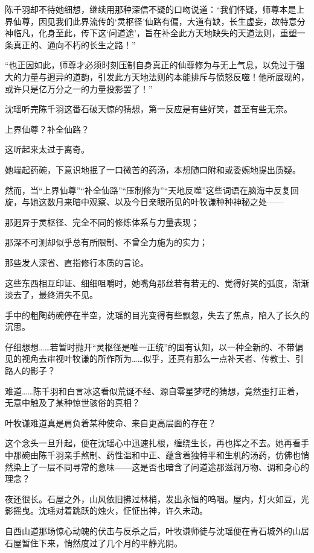 陈千羽却不待她细想，继续用那种深信不疑的口吻说道：“我们怀疑，师尊本是上界仙尊，因见我们此界流传的‘灵枢径’仙路有偏，大道有缺，长生虚妄，故特意分神临凡，化身至此，传下这‘问道途’，旨在补全此方天地缺失的天道法则，重塑一条真正的、通向不朽的长生之路！”

“也正因如此，师尊才必须时刻压制自身真正的仙尊修为与无上气息，以免过于强大的力量与迥异的道韵，引发此方天地法则的本能排斥与愤怒反噬！他所展现的，或许只是亿万分之一的力量投影罢了！”

沈瑶听完陈千羽这番石破天惊的猜想，第一反应是有些好笑，甚至有些无奈。

上界仙尊？补全仙路？

这听起来太过于离奇。

她端起药碗，下意识地抿了一口微苦的药汤，本想随口附和或委婉地提出质疑。

然而，当“上界仙尊”“补全仙路”“压制修为”“天地反噬”这些词语在脑海中反复回旋，与她这数月来暗中观察、以及今日亲眼所见的叶牧谦种种神秘之处——

那迥异于灵枢径、完全不同的修炼体系与力量表现；

那深不可测却似乎总有所限制、不曾全力施为的实力；

那些发人深省、直指修行本质的言论。

这些东西相互印证、细细咀嚼时，她嘴角那丝若有若无的、觉得好笑的弧度，渐渐淡去了，最终消失不见。

手中的粗陶药碗停在半空，沈瑶的目光变得有些飘忽，失去了焦点，陷入了长久的沉思。

仔细想想……若暂时抛开“灵枢径是唯一正统”的固有认知，以一种全新的、不带偏见的视角去审视叶牧谦的所作所为……似乎，还真有那么一点补天者、传教士、引路人的影子？

难道……陈千羽和白言冰这看似荒诞不经、源自零星梦呓的猜想，竟然歪打正着，无意中触及了某种惊世骇俗的真相？

叶牧谦难道真是肩负着某种使命、来自更高层面的存在？

这个念头一旦升起，便在沈瑶心中迅速扎根，缠绕生长，再也挥之不去。她再看手中那碗由陈千羽亲手熬制、药性温和中正、蕴含着独特平和生机的汤药，仿佛也悄然染上了一层不同寻常的意味——这是否也暗含了问道途那滋润万物、调和身心的理念？

夜还很长。石屋之外，山风依旧拂过林梢，发出永恒的呜咽。屋内，灯火如豆，光影摇曳。沈瑶对着跳跃的烛火，怔怔出神，许久未动。

\vspace{2em}

自西山道那场惊心动魄的伏击与反杀之后，叶牧谦师徒与沈瑶便在青石城外的山居石屋暂住下来，悄然度过了几个月的平静光阴。

